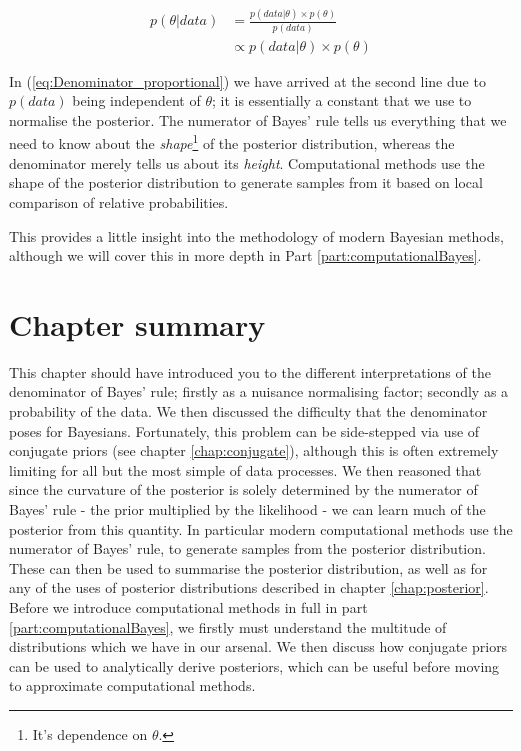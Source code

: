\documentclass[11pt,fullpage]{book}
\begin{document}
\begin{equation}\label{eq:Denominator_proportional}
\begin{align}
p(\theta|data) &= \frac{p(data|\theta)\times p(\theta)}{p(data)}\\
&\propto p(data|\theta)\times p(\theta)
\end{align}
\end{equation}

In (\ref{eq:Denominator_proportional}) we have arrived at the second line due to $p(data)$ being independent of $\theta$; it is essentially a constant that we use to normalise the posterior. The numerator of Bayes' rule tells us everything that we need to know about the \textit{shape}\footnote{It's dependence on $\theta$.} of the posterior distribution, whereas the denominator merely tells us about its \textit{height}. Computational methods use the shape of the posterior distribution to generate samples from it based on local comparison of relative probabilities. 

This provides a little insight into the methodology of modern Bayesian methods, although we will cover this in more depth in Part \ref{part:computationalBayes}. 

\section{Chapter summary}
This chapter should have introduced you to the different interpretations of the denominator of Bayes' rule; firstly as a nuisance normalising factor; secondly as a probability of the data. We then discussed the difficulty that the denominator poses for Bayesians. Fortunately, this problem can be side-stepped via use of conjugate priors (see chapter \ref{chap:conjugate}), although this is often extremely limiting for all but the most simple of data processes. We then reasoned that since the curvature of the posterior is solely determined by the numerator of Bayes' rule - the prior multiplied by the likelihood - we can learn much of the posterior from this quantity. In particular modern computational methods use the numerator of Bayes' rule, to generate samples from the posterior distribution. These can then be used to summarise the posterior distribution, as well as for any of the uses of posterior distributions described in chapter \ref{chap:posterior}. Before we introduce computational methods in full in part \ref{part:computationalBayes}, we firstly must understand the multitude of distributions which we have in our arsenal. We then discuss how conjugate priors can be used to analytically derive posteriors, which can be useful before moving to approximate computational methods.
\end{document}
